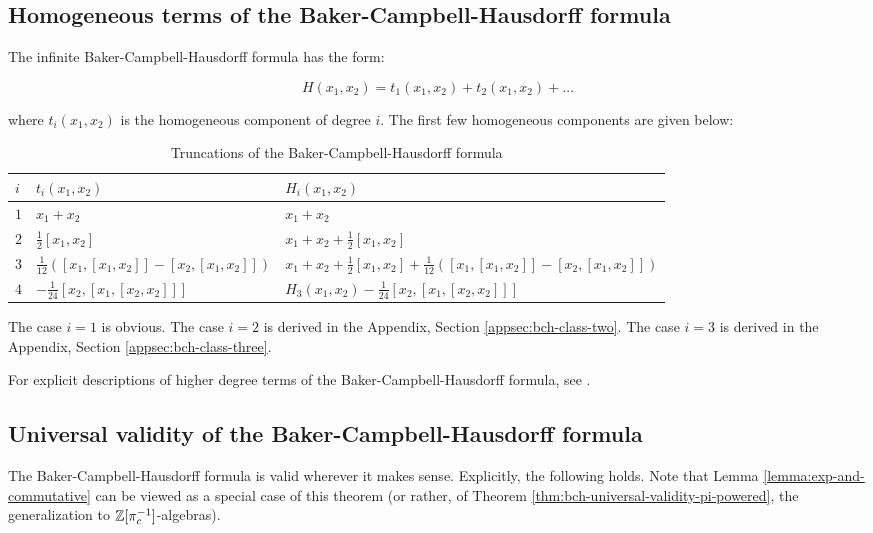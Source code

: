 \subsection{Homogeneous terms of the Baker-Campbell-Hausdorff formula}\label{sec:bch-homogeneous-terms}

The infinite Baker-Campbell-Hausdorff formula has the form:

$$H(x_1,x_2) = t_1(x_1,x_2) + t_2(x_1,x_2) + \dots$$

where $t_i(x_1,x_2)$ is the homogeneous component of degree $i$. The
first few homogeneous components are given below:

\begin{small}
\begin{table}[htbp]
\caption{Truncations of the Baker-Campbell-Hausdorff formula}\label{T4}
\begin{tabular}{|l|l|l|}
  \hline
  $i$ & $t_i(x_1,x_2)$ & $H_i(x_1,x_2)$\\\hline
  $1$ & $x_1 + x_2$ & $x_1 + x_2$ \\\hline
  $2$ & $\frac{1}{2}[x_1,x_2]$ & $x_1 + x_2 + \frac{1}{2}[x_1,x_2]$\\\hline
  $3$ & $\frac{1}{12}([x_1,[x_1,x_2]] - [x_2,[x_1,x_2]])$ & $x_1 + x_2 + \frac{1}{2}[x_1,x_2] + \frac{1}{12}([x_1,[x_1,x_2]] - [x_2,[x_1,x_2]])$ \\\hline
  $4$ & $- \frac{1}{24}[x_2,[x_1,[x_2,x_2]]]$ & $H_3(x_1,x_2) - \frac{1}{24}[x_2,[x_1,[x_2,x_2]]]$\\\hline
\end{tabular}
\end{table}
\end{small}

The case $i = 1$ is obvious. The case $i = 2$ is derived in the
Appendix, Section \ref{appsec:bch-class-two}. The case $i = 3$ is derived
in the Appendix, Section \ref{appsec:bch-class-three}.

For explicit descriptions of higher degree terms of the
Baker-Campbell-Hausdorff formula, see \cite{Lazardeffective}.

\subsection{Universal validity of the Baker-Campbell-Hausdorff formula}\label{sec:bch-formula-universal-validity}

The Baker-Campbell-Hausdorff formula is valid wherever it makes
sense. Explicitly, the following holds. Note that Lemma
\ref{lemma:exp-and-commutative} can be viewed as a special case of
this theorem (or rather, of Theorem
\ref{thm:bch-universal-validity-pi-powered}, the generalization to
$\mathbb{Z}[\pi_c^{-1}]$-algebras).

